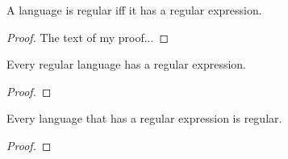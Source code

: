 %

\begin{theorem}\label{thm:regular_iff_regexp}
A language is regular iff it has a regular expression.
\end{theorem}
\begin{proof}
{}
The text of my proof...
\end{proof}

\begin{lemma}\label{lem:regular_impl_regexp}
Every regular language has a regular expression.
\end{lemma}
\begin{proof}
\end{proof}

\begin{lemma}\label{lem:regexp_impl_regular}
Every language that has a regular expression is regular.
\end{lemma}
\begin{proof}
\end{proof}
